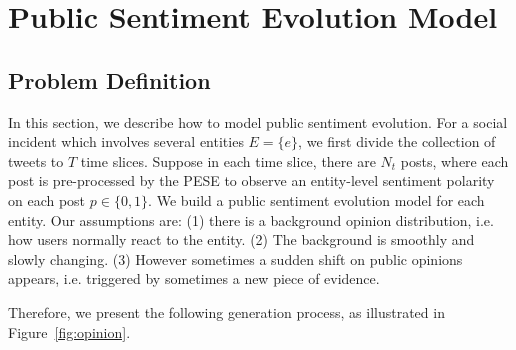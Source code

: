 \documentclass[runningheads]{llncs}
\begin{document}
\section{Public Sentiment Evolution Model}\label{sec:public opinion model}
\subsection{Problem Definition}
In this section, we describe how to model public sentiment evolution. For a social incident which involves several entities $E=\{e\}$, we first divide the collection of tweets to $T$ time slices. %
Suppose in each time slice, there are $N_t$ posts, where each post is pre-processed by the PESE to observe an entity-level sentiment polarity on each post $p\in \{0,1\}$. 
We build a public sentiment evolution model for each entity.
Our assumptions are: (1) there is a background opinion distribution, i.e. how users normally react to the entity. 
(2) The background is smoothly and slowly changing. 
(3) However sometimes a sudden shift on public opinions appears, i.e. triggered by sometimes a new piece of evidence.  

Therefore, we present the following generation process, as illustrated in Figure~\ref{fig:opinion}.
\end{document}
